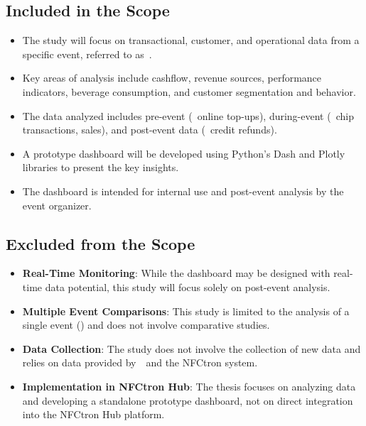 \subsection*{Included in the Scope}
\label{subsec:introduction-scope-included}
\begin{itemize}
	\item The study will focus on transactional, customer, and operational data from a specific event, referred to as~\theEvent.
	\item Key areas of analysis include cashflow, revenue sources, performance indicators, beverage consumption, and customer segmentation and behavior.
	\item The data analyzed includes pre-event (\eg~online top-ups), during-event (\eg~chip transactions, sales), and post-event data (\eg~credit refunds).
	\item A prototype dashboard will be developed using Python’s Dash and Plotly libraries to present the key insights.
	\item The dashboard is intended for internal use and post-event analysis by the event organizer.
\end{itemize}

\subsection*{Excluded from the Scope}
\label{subsec:introduction-scope-excluded}
\begin{itemize}
	\item \textbf{Real-Time Monitoring}: While the dashboard may be designed with real-time data potential, this study will focus solely on post-event analysis.
	\item \textbf{Multiple Event Comparisons}: This study is limited to the analysis of a single event (\theEvent) and does not involve comparative studies.
	\item \textbf{Data Collection}: The study does not involve the collection of new data and relies on data provided by~\theOrganizer~and the NFCtron system.
	\item \textbf{Implementation in NFCtron Hub}: The thesis focuses on analyzing data and developing a standalone prototype dashboard, not on direct integration into the NFCtron Hub platform.
\end{itemize}

